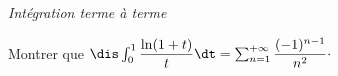 \documentclass[a4paper,10pt]{report}
\begin{document}
\medskip

\begin{center}
\textit{{ {\large Intégration terme à terme}}}
\end{center}

\medskip

\begin{Exercice}{} Montrer que $\dis \int_{0}^1 \dfrac{\ln(1+t)}{t}\dt = \sum_{n=1}^{+ \infty} \dfrac{(-1)^{n-1}}{n^2} \cdot$
\end{Exercice}
\end{document}
